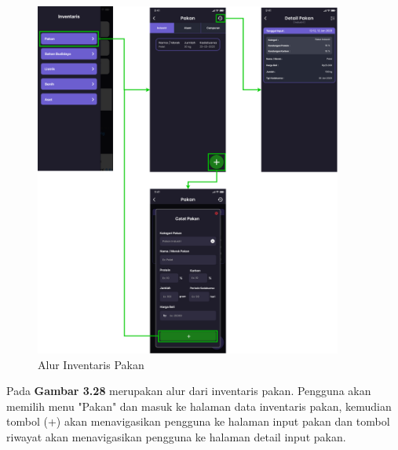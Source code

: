 \begin{enumerate}
\begin{enumerate}
		\begin{figure}[H]
			\centering
			\includegraphics[width=0.9\textwidth]{gambar/sprint2/flow_feed.png}
			\caption{Alur Inventaris Pakan}
		\end{figure}

		Pada \textbf{Gambar 3.28} merupakan alur dari inventaris pakan. Pengguna akan memilih menu "Pakan" dan masuk ke halaman data inventaris pakan, kemudian tombol (+) akan menavigasikan pengguna ke halaman input pakan dan tombol riwayat akan menavigasikan pengguna ke halaman detail input pakan.


\end{enumerate}
\end{enumerate}
